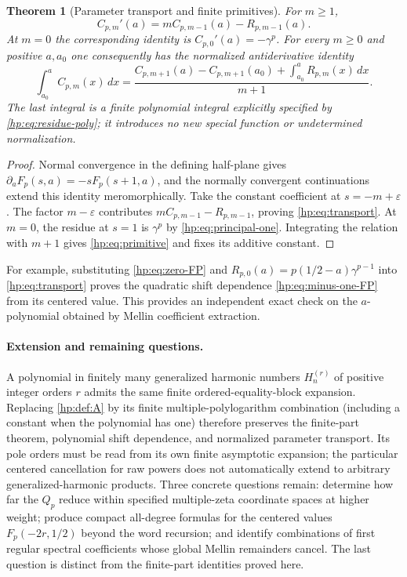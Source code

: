 \documentclass[11pt,a4paper]{article}
\numberwithin{equation}{section}
\newtheorem{theorem}{Theorem}[section]
\theoremstyle{definition}
\theoremstyle{remark}
\begin{document}
\begin{theorem}[Parameter transport and finite primitives]
\label{hp:thm:transport}
For $m\ge1$,
\begin{equation}\label{hp:eq:transport}
 C_{p,m}'(a)=mC_{p,m-1}(a)-R_{p,m-1}(a).
\end{equation}
At $m=0$ the corresponding identity is $C_{p,0}'(a)=-\gamma^p$.
For every $m\ge0$ and positive $a,a_0$ one consequently has the
normalized antiderivative identity
\begin{equation}\label{hp:eq:primitive}
 \boxed{\quad
 \int_{a_0}^a C_{p,m}(x)\,dx=
 \frac{C_{p,m+1}(a)-C_{p,m+1}(a_0)
              +\int_{a_0}^aR_{p,m}(x)\,dx}{m+1}.\quad}
\end{equation}
The last integral is a finite polynomial integral explicitly specified
by \eqref{hp:eq:residue-poly}; it introduces no new special function
or undetermined normalization.
\end{theorem}
\begin{proof}
Normal convergence in the defining half-plane gives
$\partial_aF_p(s,a)=-sF_p(s+1,a)$, and the normally convergent
continuations extend this identity meromorphically. Take the constant
coefficient at $s=-m+\varepsilon$.
The factor $m-\varepsilon$ contributes
$mC_{p,m-1}-R_{p,m-1}$, proving \eqref{hp:eq:transport}.
At $m=0$, the residue at $s=1$ is $\gamma^p$ by
\eqref{hp:eq:principal-one}. Integrating the relation with $m+1$
gives \eqref{hp:eq:primitive} and fixes its additive constant.
\end{proof}

For example, substituting \eqref{hp:eq:zero-FP} and
$R_{p,0}(a)=p(1/2-a)\gamma^{p-1}$ into
\eqref{hp:eq:transport} proves the quadratic shift dependence
\eqref{hp:eq:minus-one-FP} from its centered value. This provides an
independent exact check on the $a$-polynomial obtained by Mellin
coefficient extraction.

\paragraph{Extension and remaining questions.}
A polynomial in finitely many generalized harmonic numbers
$H_n^{(r)}$ of positive integer orders $r$ admits the same finite
ordered-equality-block expansion.
Replacing \eqref{hp:def:A} by its finite multiple-polylogarithm
combination (including a constant when the polynomial has one)
therefore preserves the finite-part theorem, polynomial
shift dependence, and normalized parameter transport. Its pole orders
must be read from its own finite asymptotic expansion; the particular
centered cancellation for raw powers does not automatically extend to
arbitrary generalized-harmonic products.
Three concrete questions remain: determine how far the $Q_p$ reduce
within specified multiple-zeta coordinate spaces at higher weight;
produce compact all-degree formulas for the centered values
$F_p(-2r,1/2)$ beyond the word recursion; and identify combinations of
first regular spectral coefficients whose global Mellin remainders
cancel. The last question is distinct from the finite-part identities
proved here.
\end{document}
